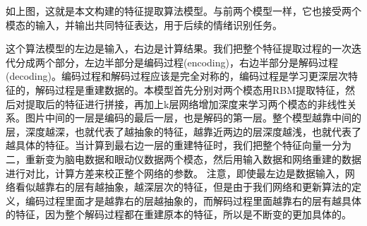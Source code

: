 		如上图，这就是本文构建的特征提取算法模型。与前两个模型一样，它也接受两个模态的输入，并输出共同特征表达，用于后续的情绪识别任务。
		
		这个算法模型的左边是输入，右边是计算结果。我们把整个特征提取过程的一次迭代分成两个部分，左边半部分是编码过程(encoding)，右边半部分是解码过程(decoding)。编码过程和解码过程应该是完全对称的，编码过程是学习更深层次特征的，解码过程是重建数据的。本模型首先分别对两个模态用RBM提取特征，然后对提取后的特征进行拼接，再加上k层网络增加深度来学习两个模态的非线性关系。图片中间的一层是编码的最后一层，也是解码的第一层。整个模型越靠中间的层，深度越深，也就代表了越抽象的特征，越靠近两边的层深度越浅，也就代表了越具体的特征。当计算到最右边一层的重建特征时，我们把整个特征向量一分为二，重新变为脑电数据和眼动仪数据两个模态，然后用输入数据和网络重建的数据进行对比，计算方差来校正整个网络的参数。 注意，即使最左边是数据输入，网络看似越靠右的层有越抽象，越深层次的特征，但是由于我们网络和更新算法的定义，编码过程里面才是越靠右的层越抽象的，而解码过程里面越靠右的层有越具体的特征，因为整个解码过程都在重建原本的特征，所以是不断变的更加具体的。
		
